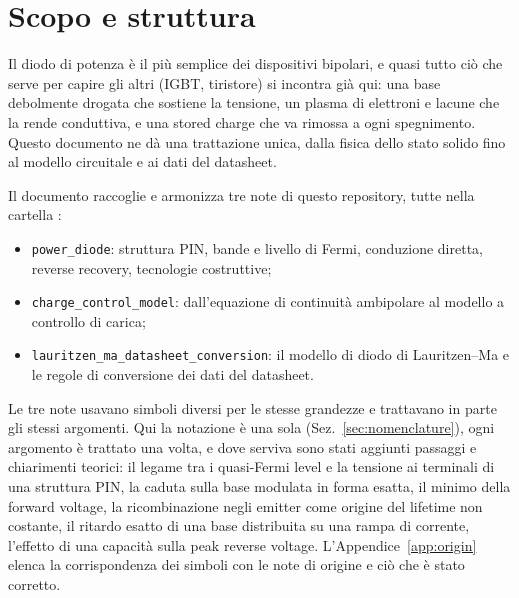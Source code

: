 \documentclass[10pt,a4paper]{scrartcl}
\begin{document}

\tableofcontents
\newpage

\section{Scopo e struttura}
\label{sec:scope}
Il diodo di potenza è il più semplice dei dispositivi bipolari, e quasi tutto ciò che serve per capire gli altri (IGBT, tiristore) si incontra già qui: una base debolmente drogata che sostiene la tensione, un plasma di elettroni e lacune che la rende conduttiva, e una stored charge che va rimossa a ogni spegnimento. Questo documento ne dà una trattazione unica, dalla fisica dello stato solido fino al modello circuitale e ai dati del datasheet.

Il documento raccoglie e armonizza tre note di questo repository, tutte nella cartella :
\begin{itemize}
\item \texttt{power\_diode}: struttura PIN, bande e livello di Fermi, conduzione diretta, reverse recovery, tecnologie costruttive;
\item \texttt{charge\_control\_model}: dall'equazione di continuità ambipolare al modello a controllo di carica;
\item \texttt{lauritzen\_ma\_datasheet\_conversion}: il modello di diodo di Lauritzen--Ma e le regole di conversione dei dati del datasheet.
\end{itemize}
Le tre note usavano simboli diversi per le stesse grandezze e trattavano in parte gli stessi argomenti. Qui la notazione è una sola (Sez.~\ref{sec:nomenclature}), ogni argomento è trattato una volta, e dove serviva sono stati aggiunti passaggi e chiarimenti teorici: il legame tra i quasi-Fermi level e la tensione ai terminali di una struttura PIN, la caduta sulla base modulata in forma esatta, il minimo della forward voltage, la ricombinazione negli emitter come origine del lifetime non costante, il ritardo esatto di una base distribuita su una rampa di corrente, l'effetto di una capacità sulla peak reverse voltage. L'Appendice~\ref{app:origin} elenca la corrispondenza dei simboli con le note di origine e ciò che è stato corretto.
\end{document}

